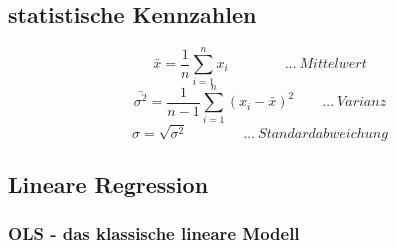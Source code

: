 \documentclass[11pt]{report}
\begin{document}
\subsection{statistische Kennzahlen}
\begin{equation}
\bar{x}=\frac{1}{n}\sum_{i=1}^{n} x_i \qquad\qquad \dots \ Mittelwert
\end{equation}
\begin{equation}
\bar{\sigma^2}=\frac{1}{n-1}\sum_{i=1}^{n} (x_i - \bar{x})^2 \qquad \dots \ Varianz
\end{equation}
\begin{equation}
\sigma=\sqrt{\sigma^2} \qquad\qquad \dots \ Standardabweichung
\end{equation}


\subsection{Lineare Regression}
\subsubsection{OLS - das klassische lineare Modell}
\end{document}
